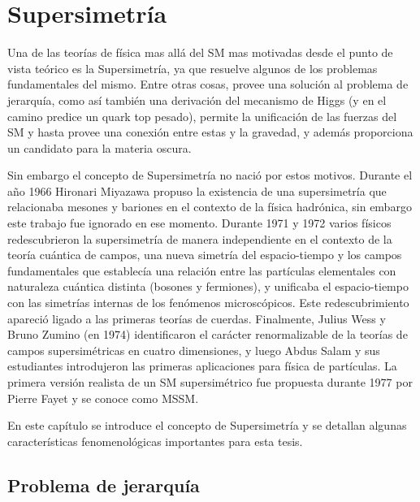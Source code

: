 \chapter{Supersimetría}

Una de las teorías de física mas allá del SM mas motivadas desde el punto de
vista teórico es la Supersimetría, ya que resuelve algunos de los problemas
fundamentales del mismo. Entre otras cosas, provee una solución al problema de
jerarquía, como así también una derivación del mecanismo de Higgs (y en el
camino predice un quark top pesado), permite la unificación de las fuerzas del
SM y hasta provee una conexión entre estas y la gravedad, y además proporciona
un candidato para la materia oscura.

Sin embargo el concepto de Supersimetría no nació por estos motivos. Durante el
a\~no 1966 Hironari Miyazawa propuso la existencia de una supersimetría que
relacionaba mesones y bariones en el contexto de la física hadrónica, sin
embargo este trabajo fue ignorado en ese momento.
Durante 1971 y 1972 varios físicos redescubrieron la supersimetría de manera
independiente en el contexto de la teoría cuántica de campos, una nueva simetría
del espacio-tiempo y los campos fundamentales que establecía una relación entre
las partículas elementales con naturaleza cuántica distinta (bosones y
fermiones), y unificaba el espacio-tiempo con las simetrías internas de los
fenómenos microscópicos. Este redescubrimiento apareció ligado a las primeras
teorías de cuerdas.
Finalmente, Julius Wess y Bruno Zumino (en 1974) identificaron el carácter
renormalizable de la teorías de campos supersimétricas en cuatro dimensiones, y
luego Abdus Salam y sus estudiantes introdujeron las primeras aplicaciones para
física de partículas. La primera versión realista de un SM supersimétrico fue
propuesta durante 1977 por Pierre Fayet y se conoce como MSSM.

En este capítulo se introduce el concepto de Supersimetría y se detallan algunas
características fenomenológicas importantes para esta tesis.


\section{Problema de jerarquía}

